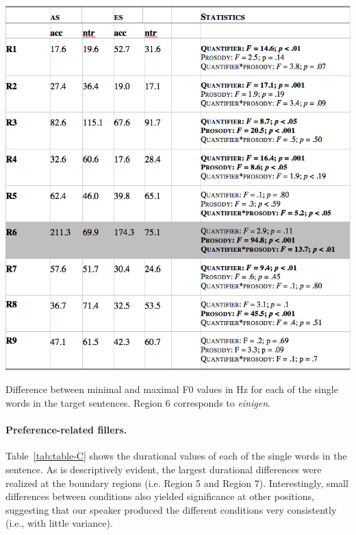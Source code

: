 \documentclass[fleqn,reqno,10pt,draft]{article}
\begin{document}
\begin{table}
  \centering
  
  \includegraphics[width=\textwidth]{../pictures/Acoustics/Table-B.png}

  \caption{Difference between minimal and maximal F0 values in Hz for
    each of the single words in the target sentences. Region 6
    corresponds to \emph{einigen}.} 
  \label{tab:table-B}
\end{table}

\paragraph{Preference-related fillers.} Table~\ref{tab:table-C} shows the
durational values of each of the single words in the sentence. As is
descriptively evident, the largest durational differences were
realized at the boundary regions (i.e. Region 5 and Region
7). Interestingly, small differences between conditions also yielded
significance at other positions, suggesting that our speaker produced
the different conditions very consistently (i.e., with little
variance).
\end{document}
